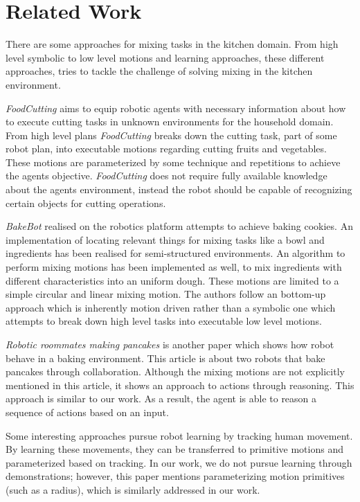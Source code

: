 \chapter{Related Work}
\label{chap:Related_work}
There are some approaches for mixing tasks in the kitchen domain. From high level symbolic to low level motions and 
learning approaches, these different approaches, tries to tackle the challenge of solving mixing in the kitchen environment.

\textit{FoodCutting}\cite{Kuempel2024} aims to equip robotic agents with necessary information about how to 
execute  cutting tasks in unknown environments for the household domain. From high level plans \textit{FoodCutting}\cite{Kuempel2024} breaks down 
the cutting task, part of some robot plan, into executable motions regarding cutting fruits and vegetables. These motions are parameterized 
by some technique and repetitions to achieve the agents objective. 
\textit{FoodCutting}\cite{Kuempel2024} does not require fully available knowledge
about the agents environment, instead the robot should be capable of recognizing certain objects for cutting 
operations. 


\textit{BakeBot}\cite{Bollini2011BakebotBC} realised on the \textit{}  robotics platform attempts to achieve baking cookies. An implementation of locating relevant things for mixing tasks
like a bowl and ingredients has been realised for semi-structured environments. An algorithm to perform mixing motions has been implemented as well, to mix 
ingredients with different characteristics into an uniform dough. These motions are limited to a simple circular and linear mixing motion.
The authors follow an bottom-up approach which is inherently motion driven rather than a
symbolic one which attempts to break down high level tasks into executable low level motions. 

\textit{Robotic roommates making pancakes}\cite{beetzrrmp} is another paper which shows how robot behave in a baking environment. This article is about two robots that bake pancakes through collaboration. 
Although the mixing motions are not explicitly mentioned in this article, it shows an approach to actions through reasoning. This approach is similar to our work. As a result, the agent is able to reason a sequence of actions based on an input.

Some interesting approaches pursue robot learning by tracking human movement\cite{10.1007/978-3-030-95892-3_22}. By learning these movements, they can be transferred to primitive motions and parameterized based on tracking.
In our work, we do not pursue learning through demonstrations; however, this paper mentions parameterizing motion primitives (such as a radius), which is similarly addressed in our work.
 
